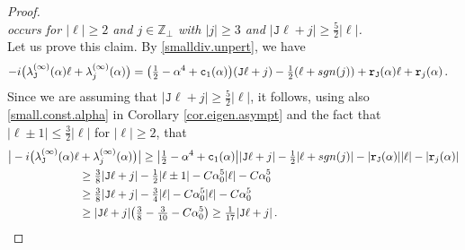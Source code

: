 \documentclass[10pt,a4paper]{amsart}
\newcommand{\Z}{{\mathbb Z}}
\newcommand{\im}{{\rm i}}
\newcommand{\tJ}{{\mathtt J}}
\newcommand{\tc}{{\mathtt c}}
\newcommand{\tr}{{\mathtt r}}
\begin{document}
\begin{proof}
\begin{equation}
   	\end{equation}
   	{\it occurs for $|\ell |\geq 2$ and $j\in \Z_{\perp}$ with $|j|\geq3$ and $|\tJ \ell + j|\geq 	\tfrac52 |\ell|$.}
    \\[1mm]
   	Let us prove this claim.
   		By \eqref{smalldiv.unpert}, we have
   		\begin{align}
   			-\im\big(  \lambda_{\tJ}^{(\infty)}(\alpha) \ell & + \lambda_{j}^{(\infty)} (\alpha) \big)   = \big( \tfrac12 - \alpha^4 +\tc_{1}(\alpha)  \big)(\tJ \ell +j) - \tfrac12(\ell +{\rm sgn}(j)) + \tr_{\tJ}(\alpha)\ell + \tr_{j}(\alpha)\,.
   		\end{align}
   		Since we are assuming that $|\tJ \ell + j| \geq \tfrac{5}{2}|\ell|$, it follows, using also \eqref{small.const.alpha} in Corollary \ref{cor.eigen.asympt} and the fact that $|\ell\pm1|\leq \tfrac32 |\ell|$ for $|\ell|\geq 2$, that
        \begin{equation}
   			\begin{aligned}
   				\big|  	-\im\big(  \lambda_{\tJ}^{(\infty)}(\alpha) \ell & + \lambda_{j}^{(\infty)} (\alpha) \big)   \big| \geq  \big|\tfrac12 -\alpha^4 + \tc_{1}(\alpha) \big| |\tJ\ell + j| -  \tfrac12 |\ell+{\rm sgn}(j)|- |\tr_{\tJ}(\alpha)| |\ell| - |\tr_{j}(\alpha)| \\
   				& \geq  \tfrac{3}{8} |\tJ\ell + j| - \tfrac12 |\ell \pm 1| - C \alpha_{0}^5 |\ell| - C \alpha_{0}^5 \\
   				& \geq \tfrac{3}{8} |\tJ\ell + j| - \tfrac34 |\ell | - C \alpha_{0}^5 |\ell| - C \alpha_{0}^5 \\
   				& \geq |\tJ\ell + j|\big(\tfrac38-\tfrac{3}{10}-C\alpha_0^5  \big)\geq\tfrac{1}{17}|\tJ\ell + j|\,.
   			\end{aligned}
   		\end{equation}

\end{proof}
\end{document}
